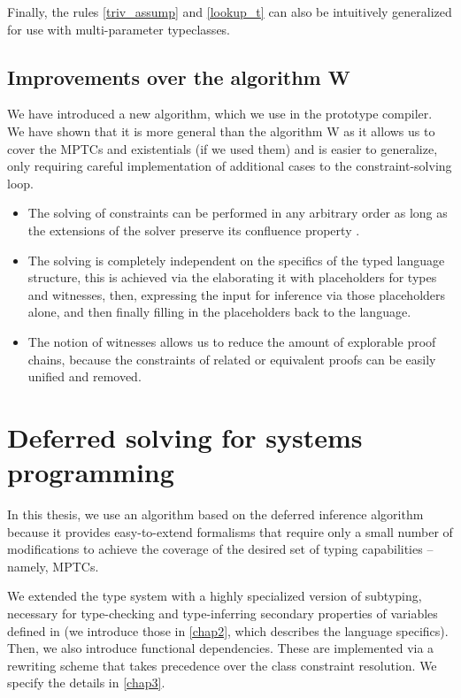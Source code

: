 Finally, the rules \ref{triv_assump} and \ref{lookup_t} can also be intuitively generalized for use with multi-parameter typeclasses.

\subsection{Improvements over the algorithm W}

We have introduced a new algorithm, which we use in the prototype compiler. We have shown that it is more general than the algorithm W as it allows us to cover the MPTCs and existentials (if we used them) and is easier to generalize, only requiring careful implementation of additional cases to the constraint-solving loop.

\begin{itemize}
    \item  The solving of constraints can be performed in any arbitrary order as long as the extensions of the solver preserve its confluence property \cite{vytiniotis2011outsidein}.

    \item The solving is completely independent on the specifics of the typed language structure, this is achieved via the elaborating it with placeholders for types and witnesses, then, expressing the input for inference via those placeholders alone, and then finally filling in the placeholders back to the language.

    \item The notion of witnesses allows us to reduce the amount of explorable proof chains, because the constraints of related or equivalent proofs can be easily unified and removed.
\end{itemize}

\section{Deferred solving for systems programming}
\label{sys_defer}

In this thesis, we use an algorithm based on the deferred inference algorithm because it provides easy-to-extend formalisms that require only a small number of modifications to achieve the coverage of the desired set of typing capabilities -- namely, MPTCs.

We extended the type system with a highly specialized version of subtyping, necessary for type-checking and type-inferring secondary properties of variables defined in \cmm (we introduce those in \cref{chap2}, which describes the language specifics). Then, we also introduce functional dependencies. These are implemented via a rewriting scheme that takes precedence over the class constraint resolution. We specify the details in \cref{chap3}.

